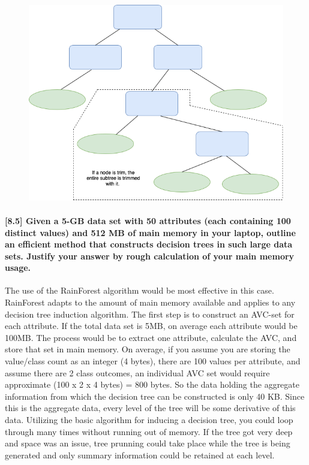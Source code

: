 \documentclass[11pt]{article}
\makeatletter
\def\maxwidth{\ifdim\Gin@nat@width>\linewidth\linewidth
    \else\Gin@nat@width\fi}
\let\Oldincludegraphics\includegraphics
\renewcommand{\includegraphics}[1]{\Oldincludegraphics[width=.8\maxwidth]{#1}}
\makeatother
\begin{document}
    \begin{figure}
\centering
\includegraphics{tree.png}
\caption{}
\end{figure}

    \paragraph{{[}8.5{]} Given a 5-GB data set with 50 attributes (each
containing 100 distinct values) and 512 MB of main memory in your
laptop, outline an efficient method that constructs decision trees in
such large data sets. Justify your answer by rough calculation of your
main memory
usage.}\label{given-a-5-gb-data-set-with-50-attributes-each-containing-100-distinct-values-and-512-mb-of-main-memory-in-your-laptop-outline-an-efficient-method-that-constructs-decision-trees-in-such-large-data-sets.-justify-your-answer-by-rough-calculation-of-your-main-memory-usage.}

    The use of the RainForest algorithm would be most effective in this
case. RainForest adapts to the amount of main memory available and
applies to any decision tree induction algorithm. The first step is to
construct an AVC-set for each attribute. If the total data set is 5MB,
on average each attribute would be 100MB. The process would be to
extract one attribute, calculate the AVC, and store that set in main
memory. On average, if you assume you are storing the value/class count
as an integer (4 bytes), there are 100 values per attribute, and assume
there are 2 class outcomes, an individual AVC set would require
approximate (100 x 2 x 4 bytes) = 800 bytes. So the data holding the
aggregate information from which the decision tree can be constructed is
only 40 KB. Since this is the aggregate data, every level of the tree
will be some derivative of this data. Utilizing the basic algorithm for
inducing a decision tree, you could loop through many times without
running out of memory. If the tree got very deep and space was an issue,
tree prunning could take place while the tree is being generated and
only summary information could be retained at each level.
\end{document}
